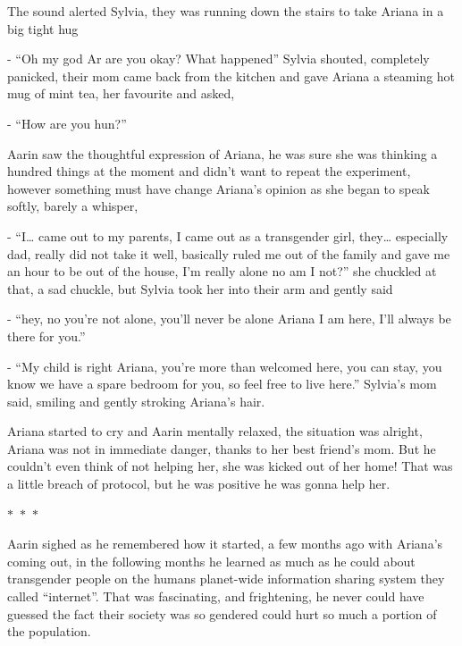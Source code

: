 \documentclass[hidelinks,12pt,a4paper]{book}
\newcommand\sep{\begin{center}
  \boldmath $\ast$~$\ast$~$\ast$
\end{center}}
\begin{document}
The sound alerted Sylvia, they was running down the stairs to take Ariana in a big tight hug\newline

- “Oh my god Ar are you okay? What happened” Sylvia shouted, completely panicked, 
their mom came back from the kitchen and gave Ariana a steaming hot mug of mint tea, her favourite and asked,\newline

- “How are you hun?”\par
\bigskip

Aarin saw the thoughtful expression of Ariana, he was sure she was thinking a hundred 
things at the moment and didn't want to repeat the experiment, however something must have change 
Ariana's opinion as she began to speak softly, barely a whisper, \par
\bigskip

- “I… came out to my parents, I came out as a transgender girl, they… especially dad, 
really did not take it well, basically ruled me out of the family and gave me an hour to be out 
of the house, I'm really alone no am I not?” she chuckled at that, a sad chuckle, 
but Sylvia took her into their arm and gently said\par
\bigskip
- “hey, no you're not alone, you'll never be alone Ariana I am here, I'll always be there for you.”\par
\bigskip
- “My child is right Ariana, you're more than welcomed here, you can stay,
 you know we have a spare bedroom for you, so feel free to live here.” Sylvia's mom said,
  smiling and gently stroking Ariana's hair.\par
  \bigskip

Ariana started to cry and Aarin mentally relaxed, the situation was alright, 
Ariana was not in immediate danger, thanks to her best friend's mom.
 But he couldn't even think of not helping her, she was kicked out of her home! That was a little breach of protocol,
 but he was positive he was gonna help her.

 \sep

Aarin sighed as he remembered how it started, a few months ago with Ariana's coming out, in the following months he 
learned as much as he could about transgender people on the humans planet-wide information sharing system 
they called “internet”. That was fascinating, and frightening, he never could have guessed the fact their 
society was so gendered could hurt so much a portion of the population.\par
\bigskip
\end{document}
